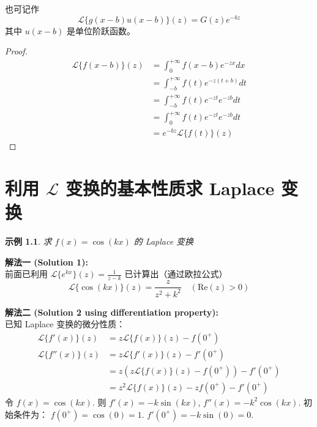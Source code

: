 \documentclass[linespread=1.5,openany]{book}%
\def\diff{d}%
\theoremstyle{plain}
\newtheorem{example}[theorem]{示例}
\newcommand{\diff}{\mathop{}\!\mathrm{d}}  %
\begin{document}
{{{{						也可记作
						\[ \mathcal{L}\{g(x-b)u(x-b)\}(z) = G(z)e^{-bz} \]
						其中 $u(x-b)$ 是单位阶跃函数。
						\begin{proof}
							\begin{align*}
								\mathcal{L}\{f(x-b)\}(z) &= \int_{0}^{+\infty} f(x-b) e^{-zx} \diff x \\
								&= \int_{-b}^{+\infty} f(t) e^{-z(t+b)} \diff t \\
								&= \int_{-b}^{+\infty} f(t) e^{-zt}e^{-zb} \diff t \\
								&= \int_{0}^{+\infty} f(t) e^{-zt}e^{-zb} \diff t \\
								&= e^{-bz} \mathcal{L}\{f(t)\}(z)
							\end{align*}
						\end{proof}
					} %
				} %
				
				
				{\chapter{利用 $\mathcal{L}$ 变换的基本性质求 Laplace 变换} \label{ch:laplace_applications_L15}
					{ %
						
						\begin{example}求 $f(x)=\cos(kx)$ 的 Laplace 变换 \label{ex:L15_ch_app_coskx}
						\end{example} %
						
						
						\noindent\textbf{解法一 (Solution 1):} \\
						前面已利用 $\mathcal{L}\{e^{kx}\}(z) = \frac{1}{z-k}$ 已计算出（通过欧拉公式）
						\[ \mathcal{L}\{\cos(kx)\}(z) = \frac{z}{z^2+k^2} \quad (\text{Re}(z)>0) \]
						\vspace{\baselineskip} %
						
						\noindent\textbf{解法二 (Solution 2 using differentiation property):} \\
						已知 Laplace 变换的微分性质：
						\begin{align}
							\mathcal{L}\{f'(x)\}(z) &= z\mathcal{L}\{f(x)\}(z) - f(0^+) \label{eq:L15_ch_app_diff1} \\
							\mathcal{L}\{f''(x)\}(z) &= z\mathcal{L}\{f'(x)\}(z) - f'(0^+) \nonumber \\
							&= z(z\mathcal{L}\{f(x)\}(z) - f(0^+)) - f'(0^+) \nonumber \\
							&= z^2\mathcal{L}\{f(x)\}(z) - zf(0^+) - f'(0^+) \label{eq:L15_ch_app_diff2}
						\end{align}
						令 $f(x) = \cos(kx)$.
						则 $f'(x) = -k\sin(kx)$, $f''(x) = -k^2\cos(kx)$.
						初始条件为：
						$f(0^+) = \cos(0) = 1$.
						$f'(0^+) = -k\sin(0) = 0$.
						
}}}}
\end{document}

